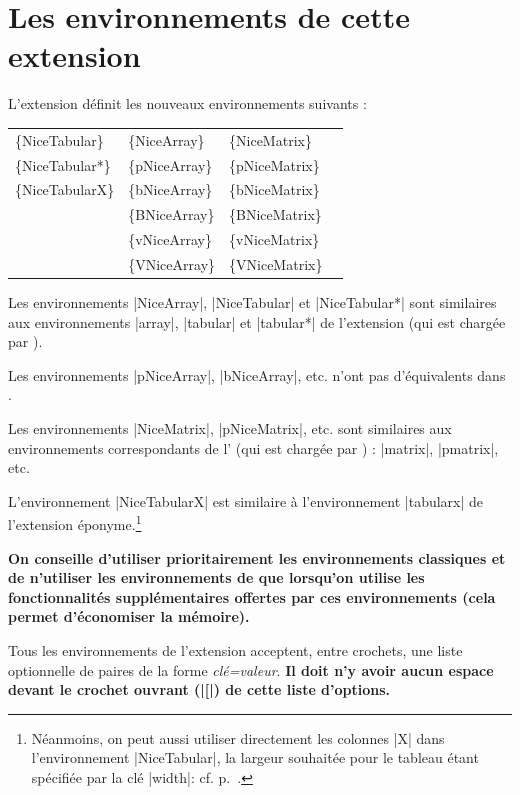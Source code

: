 \documentclass[dvipsnames]{article}%
\begin{document}
\newpage

\section{Les environnements de cette extension}

L'extension  définit les nouveaux environnements suivants :

\medskip
\begin{ttfamily}
\setlength{\tabcolsep}{3mm}
\begin{tabular}{llll}
\{NiceTabular\}  & \{NiceArray\}  & \{NiceMatrix\}   \\
\{NiceTabular*\} & \{pNiceArray\} & \{pNiceMatrix\}  \\
\{NiceTabularX\} & \{bNiceArray\} & \{bNiceMatrix\}  \\
                 & \{BNiceArray\} & \{BNiceMatrix\}  \\
                 & \{vNiceArray\} & \{vNiceMatrix\}  \\
                 & \{VNiceArray\} & \{VNiceMatrix\}
\end{tabular}
\end{ttfamily}


\medskip
Les environnements |{NiceArray}|, |{NiceTabular}| et |{NiceTabular*}| sont
similaires aux environnements |{array}|, |{tabular}| et |{tabular*}| de
l'extension  (qui est chargée par ).


\medskip
Les environnements |{pNiceArray}|, |{bNiceArray}|, etc. n'ont pas d'équivalents
dans .

\medskip
Les environnements |{NiceMatrix}|, |{pNiceMatrix}|, etc. sont similaires aux
environnements correspondants de l' (qui est chargée par
) : |{matrix}|, |{pmatrix}|, etc.

\medskip
L'environnement |{NiceTabularX}| est similaire à l'environnement |{tabularx}| de
l'extension éponyme.\footnote{Néanmoins, on peut aussi utiliser directement les
  colonnes |X| dans l'environnement |{NiceTabular}|, la largeur
  souhaitée pour le tableau étant spécifiée par la clé |width|: cf.
  p.~\pageref{colonne-X}.}


\medskip
\textbf{On conseille d'utiliser prioritairement les environnements classiques et de
n'utiliser les environnements de  que lorsqu'on utilise les
fonctionnalités supplémentaires offertes par ces environnements (cela permet
d'économiser la mémoire).}

\medskip
Tous les environnements de l'extension  acceptent, entre
crochets, une liste optionnelle de paires de la forme \textsl{clé=valeur}.
{\bfseries Il doit n'y avoir aucun espace devant le crochet ouvrant (|[|) de
  cette liste d'options.}
\end{document}

